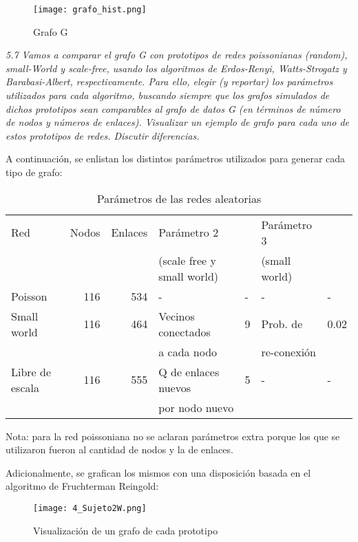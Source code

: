 \documentclass{article}
\begin{document}
\begin{figure}[H]
  \centering  
  \texttt{[image: grafo\_hist.png]}
  \caption{Grafo G}
\end{figure}


\textit{5.7 Vamos a comparar el grafo G con prototipos de redes poissonianas (random), small-World
 y scale-free, usando los algoritmos de Erdos-Renyi, Watts-Strogatz y Barabasi-Albert, respectivamente.
 Para ello, elegir (y reportar) los parámetros utilizados para cada algoritmo, 
buscando siempre que los grafos simulados de dichos prototipos sean comparables al grafo de datos G 
(en términos de número de nodos y números de enlaces). Visualizar un ejemplo de grafo para cada uno de 
estos prototipos de redes. Discutir diferencias.}

A continuación, se enlistan los distintos parámetros utilizados para generar cada tipo
de grafo:

\begin{table}[h]
  \caption{Parámetros de las redes aleatorias}
  \begin{tabular}{lrrllll}
  \toprule
  Red & Nodos & Enlaces & Parámetro 2  &  & Parámetro 3 &  \\
      &       &         & (scale free y small world) &  & (small world) &  \\
  \midrule
  Poisson & 116 & 534 & - & - & - & - \\
  Small world & 116 & 464 & Vecinos conectados  & 9 & Prob. de  & 0.02 \\
              &     &     & a cada nodo         &    & re-conexión   &\\
  Libre de escala & 116 & 555 & Q de enlaces nuevos & 5 & - & - \\
                  &     &     &  por nodo nuevo     &&&\\
  \bottomrule
  \end{tabular}
  \end{table}
  
Nota: para la red poissoniana no se aclaran parámetros extra porque los que se
utilizaron fueron al cantidad de nodos y la de enlaces.

Adicionalmente, se grafican los mismos con una disposición basada en 
el algoritmo de Fruchterman Reingold:

\begin{figure}[H]
  \centering  
  \texttt{[image: 4\_Sujeto2W.png]}
  \caption{Visualización de un grafo de cada prototipo}
\end{figure}
\end{document}
